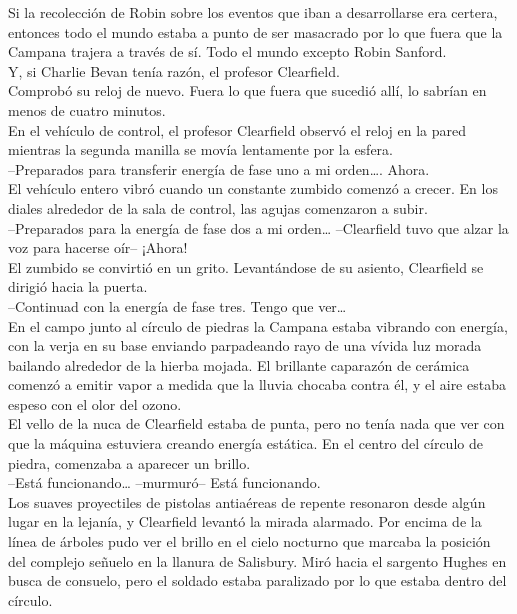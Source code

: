 Si la recolección de Robin sobre los eventos que iban a desarrollarse
era certera, entonces todo el mundo estaba a punto de ser masacrado por
lo que fuera que la Campana trajera a través de sí. Todo el mundo
excepto Robin Sanford.\\
Y, si Charlie Bevan tenía razón, el profesor Clearfield.\\
Comprobó su reloj de nuevo. Fuera lo que fuera que sucedió allí, lo
sabrían en menos de cuatro minutos.\\[2\baselineskip]En el vehículo de
control, el profesor Clearfield observó el reloj en la pared mientras la
segunda manilla se movía lentamente por la esfera.\\
--Preparados para transferir energía de fase uno a mi orden\ldots{}.
Ahora.\\
El vehículo entero vibró cuando un constante zumbido comenzó a crecer.
En los diales alrededor de la sala de control, las agujas comenzaron a
subir.\\
--Preparados para la energía de fase dos a mi orden\ldots{} --Clearfield
tuvo que alzar la voz para hacerse oír-- ¡Ahora!\\
El zumbido se convirtió en un grito. Levantándose de su asiento,
Clearfield se dirigió hacia la puerta.\\
--Continuad con la energía de fase tres. Tengo que ver\ldots{}\\
En el campo junto al círculo de piedras la Campana estaba vibrando con
energía, con la verja en su base enviando parpadeando rayo de una vívida
luz morada bailando alrededor de la hierba mojada. El brillante
caparazón de cerámica comenzó a emitir vapor a medida que la lluvia
chocaba contra él, y el aire estaba espeso con el olor del ozono.\\
El vello de la nuca de Clearfield estaba de punta, pero no tenía nada
que ver con que la máquina estuviera creando energía estática. En el
centro del círculo de piedra, comenzaba a aparecer un brillo.\\
--Está funcionando\ldots{} --murmuró-- Está funcionando.\\
Los suaves proyectiles de pistolas antiaéreas de repente resonaron desde
algún lugar en la lejanía, y Clearfield levantó la mirada alarmado. Por
encima de la línea de árboles pudo ver el brillo en el cielo nocturno
que marcaba la posición del complejo señuelo en la llanura de Salisbury.
Miró hacia el sargento Hughes en busca de consuelo, pero el soldado
estaba paralizado por lo que estaba dentro del círculo.\\
